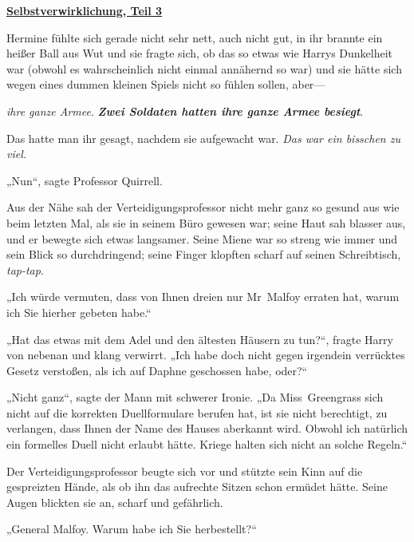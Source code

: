 

\hypertarget{selbstverwirklichung-teil-3}{%

\textbf{\uline{Selbstverwirklichung, Teil 3}}

Hermine fühlte sich gerade nicht sehr nett, auch nicht gut, in ihr brannte ein heißer Ball aus Wut und sie fragte sich, ob das so etwas wie Harrys Dunkelheit war (obwohl es wahrscheinlich nicht einmal annähernd so war) und sie hätte sich wegen eines dummen kleinen Spiels nicht so fühlen sollen, aber—

\emph{ihre ganze Armee}. \textbf{\emph{Zwei Soldaten hatten ihre ganze Armee besiegt}}.

Das hatte man ihr gesagt, nachdem sie aufgewacht war. \emph{Das war ein bisschen zu viel.}

„Nun“, sagte Professor Quirrell.

Aus der Nähe sah der Verteidigungsprofessor nicht mehr ganz so gesund aus wie beim letzten Mal, als sie in seinem Büro gewesen war; seine Haut sah blasser aus, und er bewegte sich etwas langsamer. Seine Miene war so streng wie immer und sein Blick so durchdringend; seine Finger klopften scharf auf seinen Schreibtisch, \emph{tap-tap}.

„Ich würde vermuten, dass von Ihnen dreien nur Mr~Malfoy erraten hat, warum ich Sie hierher gebeten habe.“

„Hat das etwas mit dem Adel und den ältesten Häusern zu tun?“, fragte Harry von nebenan und klang verwirrt. „Ich habe doch nicht gegen irgendein verrücktes Gesetz verstoßen, als ich auf Daphne geschossen habe, oder?“

„Nicht ganz“, sagte der Mann mit schwerer Ironie. „Da Miss~Greengrass sich nicht auf die korrekten Duellformulare berufen hat, ist sie nicht berechtigt, zu verlangen, dass Ihnen der Name des Hauses aberkannt wird. Obwohl ich natürlich ein formelles Duell nicht erlaubt hätte. Kriege halten sich nicht an solche Regeln.“

Der Verteidigungsprofessor beugte sich vor und stützte sein Kinn auf die gespreizten Hände, als ob ihn das aufrechte Sitzen schon ermüdet hätte. Seine Augen blickten sie an, scharf und gefährlich.

„General Malfoy. Warum habe ich Sie herbestellt?“

}
